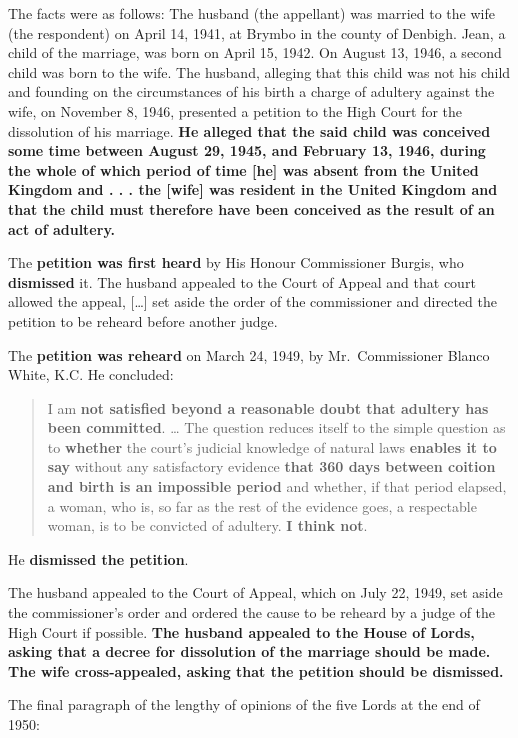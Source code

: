 \documentclass[]{book}
\begin{document}
The facts were as follows: The husband (the appellant) was married to the wife (the respondent) on April 14, 1941, at Brymbo in the county of Denbigh. Jean, a child of the marriage, was born on April 15, 1942. On August 13, 1946, a second child was born to the wife. The husband, alleging that this child was not his child and founding on the circumstances of his birth a charge of adultery against the wife, on November 8, 1946, presented a petition to the High Court for the dissolution of his marriage. \textbf{He alleged that the said child was conceived some time between August 29, 1945, and February 13, 1946, during the whole of which period of time {[}he{]} was absent from the United Kingdom and . . . the {[}wife{]} was resident in the United Kingdom and that the child must therefore have been conceived as the result of an act of adultery.}

The \textbf{petition was first heard} by His Honour Commissioner Burgis, who \textbf{dismissed} it. The husband appealed to the Court of Appeal and that court allowed the appeal, {[}\ldots{}{]} set aside the order of the commissioner and directed the petition to be reheard before another judge.

The \textbf{petition was reheard} on March 24, 1949, by Mr.~Commissioner Blanco White, K.C. He concluded:

\begin{quote}
I am \textbf{not satisfied beyond a reasonable doubt that adultery has been committed}. \ldots{} The question reduces itself to the simple question as to \textbf{whether} the court's judicial knowledge of natural laws \textbf{enables it to say} without any satisfactory evidence \textbf{that 360 days between coition and birth is an impossible period} and whether, if that period elapsed, a woman, who is, so far as the rest of the evidence goes, a respectable woman, is to be convicted of adultery. \textbf{I think not}.
\end{quote}

He \textbf{dismissed the petition}.

The husband appealed to the Court of Appeal, which on July 22, 1949, set aside the commissioner's order and ordered the cause to be reheard by a judge of the High Court if possible. \textbf{The husband appealed to the House of Lords, asking that a decree for dissolution of the marriage should be made. The wife cross-appealed, asking that the petition should be dismissed.}

The final paragraph of the lengthy of opinions of the five Lords at the end of 1950:
\end{document}
